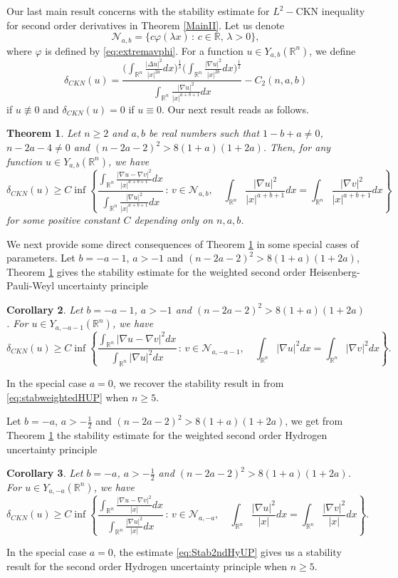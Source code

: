 \documentclass[a4paper,12pt]{article}
\theoremstyle{plain}
\newtheorem{theorem}{Theorem}[section]
\newtheorem{corollary}[theorem]{Corollary}
\theoremstyle{definition}
\theoremstyle{remark}
\def\R{\mathbb R}%
\def\irn{\int_{\R^n}}
\numberwithin{equation}{section}
\begin{document}
Our last main result concerns with  the stability estimate for $L^2-$CKN inequality for second order derivatives in Theorem \ref{MainII}. Let us denote
 \[
 \mathcal N_{a,b} = \{c \varphi(\lambda x)\, :\, c \in \R,\, \lambda >0\},
 \]
where $\varphi$ is defined by \eqref{eq:extremavphi}. For a function $u\in Y_{a,b}(\R^n)$, we define
\[
\delta_{CKN}(u) = \frac{\Big(\irn \frac{|\Delta u|^2}{|x|^{2a}} dx \Big)^{\frac12}\Big(\irn \frac{|\nabla u|^2}{|x|^{2b}} dx\Big)^{\frac12}}{\irn \frac{|\nabla u|^2}{|x|^{a+b+1}} dx} -C_2(n,a,b)
\]
if $u\not\equiv 0$ and $\delta_{CKN}( u) =0$ if $u \equiv 0$. Our next result reads as follows.
\begin{theorem}\label{MainIII}
Let $n\geq 2$ and $a, b$ be real numbers such that $1-b + a\not=0$, $n-2a -4\not=0$ and $(n-2a -2)^2 > 8(1+a)(1+2a)$. Then,  for any function $u\in Y_{a,b}(\R^n)$, we have
\begin{equation*}%
\delta_{CKN}(u) \geq C \inf\left\{\frac{\irn \frac{|\nabla u - \nabla v|^2}{|x|^{a+b+1}} dx}{\irn \frac{|\nabla u |^2}{|x|^{a+b+1}} dx}\, :\, v \in \mathcal N_{a,b},\quad \irn \frac{|\nabla u |^2}{|x|^{a+b+1}} dx = \irn \frac{|\nabla v|^2}{|x|^{a+b+1}} dx\right\}
\end{equation*}
for some positive constant $C$ depending only on $n,a,b$.
\end{theorem}
We next provide some direct consequences of Theorem \ref{MainIII} in some special cases of parameters. 	Let $b= -a -1$, $a > -1$ and $(n-2a -2)^2 > 8(1+a)(1+2a)$, Theorem \ref{MainIII} gives the stability estimate for the weighted second order Heisenberg-Pauli-Weyl uncertainty principle 
 \begin{corollary}
Let $b= -a -1$, $a > -1$ and $(n-2a -2)^2 > 8(1+a)(1+2a)$. For $u\in Y_{a,-a-1}(\R^n)$, we have
\begin{equation}\label{eq:stabweightedHUP}
\delta_{CKN}(u) \geq C \inf\left\{\frac{\irn |\nabla u - \nabla v|^2 dx}{\irn |\nabla u |^2 dx}\, :\, v \in \mathcal N_{a,-a-1},\quad \irn |\nabla u |^2 dx = \irn |\nabla v|^2dx\right\}.
\end{equation}
\end{corollary}
\noindent In the special case $a =0$, we recover the stability result in \cite{DNCVPDE} from \eqref{eq:stabweightedHUP} when $n\geq 5$. 

	Let $b = -a$, $a > -\frac12$ and $(n-2a -2)^2 > 8(1+a)(1+2a)$, we get from Theorem \ref{MainIII} the stability estimate for the weighted second order Hydrogen uncertainty principle
\begin{corollary}
Let $b = -a$, $a > -\frac12$ and $(n-2a -2)^2 > 8(1+a)(1+2a)$. For $u\in Y_{a,-a}(\R^n)$, we have
\begin{equation}\label{eq:Stab2ndHyUP}
\delta_{CKN}(u) \geq C \inf\left\{\frac{\irn \frac{|\nabla u - \nabla v|^2}{|x|} dx}{\irn \frac{|\nabla u |^2}{|x|} dx}\, :\, v \in \mathcal N_{a,-a},\quad \irn \frac{|\nabla u |^2}{|x|} dx = \irn \frac{|\nabla v|^2}{|x|} dx\right\}.
\end{equation}
\end{corollary}
\noindent In the special case $a =0$, the estimate \eqref{eq:Stab2ndHyUP} gives us a stability result for the second order Hydrogen uncertainty principle when $n\geq 5$.
\end{document}

